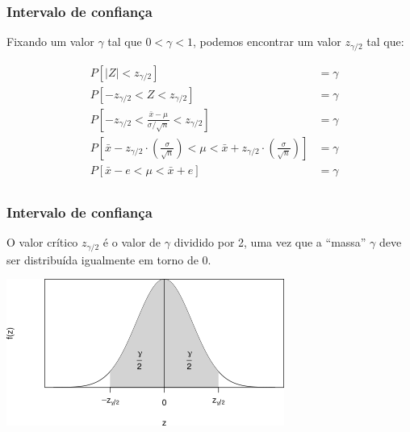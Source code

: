 \documentclass[11pt]{beamer}
\begin{document}
\begin{frame}
\frametitle{Intervalo de confiança}

Fixando um valor \(\gamma\) tal que \(0 < \gamma < 1\), podemos
encontrar um valor \(z_{\gamma/2}\) tal que:

\begin{align*}
&P[|Z| < z_{\gamma/2}] &= \gamma \\
&P[-z_{\gamma/2} < Z < z_{\gamma/2}] &= \gamma \\
&P[-z_{\gamma/2} < \frac{\bar{x} - \mu}{\sigma/\sqrt{n}} <
z_{\gamma/2}] &= \gamma \\
&P[\bar{x} - z_{\gamma/2} \cdot
\left(\frac{\sigma}{\sqrt{n}} \right) < \mu < \bar{x} + z_{\gamma/2}
\cdot \left(\frac{\sigma}{\sqrt{n}} \right)] &= \gamma \\
&P[\bar{x} - e < \mu < \bar{x} + e] &= \gamma \\
\end{align*}
\end{frame}

\begin{frame}
\frametitle{Intervalo de confiança}

O valor crítico \(z_{\gamma/2}\) é o valor de \(\gamma\) dividido por 2,
uma vez que a ``massa'' \(\gamma\) deve ser distribuída igualmente em
torno de 0.

\begin{center}\includegraphics[width=0.8\linewidth]{figs/unnamed_chunk_1_1} \end{center}
\end{frame}
\end{document}
